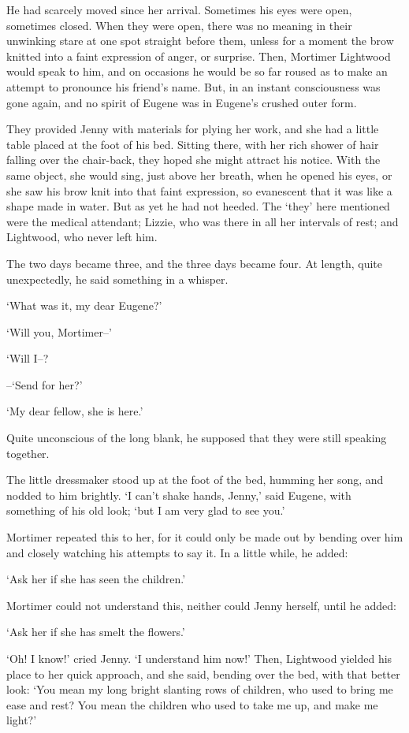 He had scarcely moved since her arrival. Sometimes his eyes were open,
sometimes closed. When they were open, there was no meaning in their
unwinking stare at one spot straight before them, unless for a moment
the brow knitted into a faint expression of anger, or surprise. Then,
Mortimer Lightwood would speak to him, and on occasions he would be so
far roused as to make an attempt to pronounce his friend’s name. But, in
an instant consciousness was gone again, and no spirit of Eugene was in
Eugene’s crushed outer form.

They provided Jenny with materials for plying her work, and she had a
little table placed at the foot of his bed. Sitting there, with her rich
shower of hair falling over the chair-back, they hoped she might attract
his notice. With the same object, she would sing, just above her breath,
when he opened his eyes, or she saw his brow knit into that faint
expression, so evanescent that it was like a shape made in water. But
as yet he had not heeded. The ‘they’ here mentioned were the medical
attendant; Lizzie, who was there in all her intervals of rest; and
Lightwood, who never left him.

The two days became three, and the three days became four. At length,
quite unexpectedly, he said something in a whisper.

‘What was it, my dear Eugene?’

‘Will you, Mortimer--’

‘Will I--?

--‘Send for her?’

‘My dear fellow, she is here.’

Quite unconscious of the long blank, he supposed that they were still
speaking together.

The little dressmaker stood up at the foot of the bed, humming her song,
and nodded to him brightly. ‘I can’t shake hands, Jenny,’ said Eugene,
with something of his old look; ‘but I am very glad to see you.’

Mortimer repeated this to her, for it could only be made out by bending
over him and closely watching his attempts to say it. In a little while,
he added:

‘Ask her if she has seen the children.’

Mortimer could not understand this, neither could Jenny herself, until
he added:

‘Ask her if she has smelt the flowers.’

‘Oh! I know!’ cried Jenny. ‘I understand him now!’ Then, Lightwood
yielded his place to her quick approach, and she said, bending over the
bed, with that better look: ‘You mean my long bright slanting rows of
children, who used to bring me ease and rest? You mean the children who
used to take me up, and make me light?’

